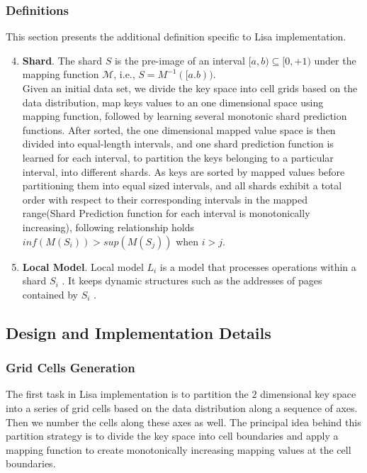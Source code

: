 \subsubsection{Definitions}

This section presents the additional definition specific to Lisa implementation.

\begin{enumerate}
\setcounter{enumi}{3}
	\item \textbf{Shard}. The shard $S$ is the pre-image of an
interval $[a, b) \subseteq [0, +1)$ under the mapping function $\mathcal{M}$,  i.e., $S = M^{-1}([a.b))$. \\
Given an initial data set, we divide the key space into cell grids based on the data distribution, map keys values to an one dimensional space using mapping function, followed by learning several monotonic shard prediction functions. After sorted, the one dimensional mapped value space is then divided into equal-length intervals, and one shard prediction function is learned for each interval, to partition the keys belonging to a particular interval, into different shards. As keys are sorted by mapped values before partitioning them into equal sized intervals, and all shards exhibit a total order with respect to their corresponding intervals in the mapped range(Shard Prediction function for each interval is monotonically increasing), following relationship holds \\
$ inf (M(S_{i}))  > sup (M(S_{j}))$ when $i > j$.

\item \textbf{Local Model}. Local model $L_{i}$ is a model
that processes operations within a shard $S_i$ . It keeps dynamic
structures such as the addresses of pages contained by $S_{i}$ .
\end{enumerate}

\subsection{Design and Implementation Details}
\subsubsection{Grid Cells Generation}
The first task in Lisa implementation is to partition the $2$ dimensional key space into a series of grid cells based on the data distribution along a sequence of axes. Then we number the cells along these axes as well. The principal idea behind this partition strategy is to divide the key space into cell boundaries and apply a mapping function to create monotonically increasing mapping values at the cell boundaries. 

